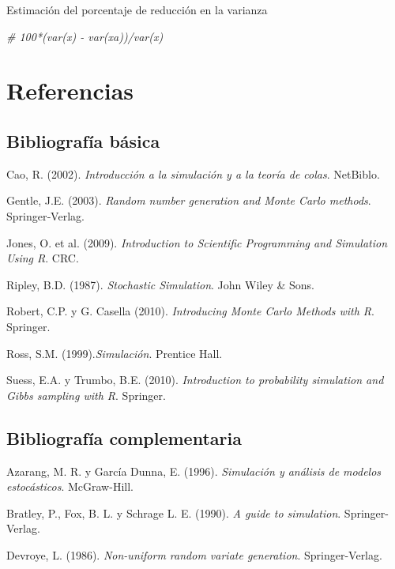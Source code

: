 \documentclass[]{book}
\newenvironment{Shaded}{\begin{snugshade}}{\end{snugshade}}
\newcommand{\CommentTok}[1]{\textcolor[rgb]{0.56,0.35,0.01}{\textit{#1}}}
\theoremstyle{definition}
\theoremstyle{definition}
\theoremstyle{definition}
\theoremstyle{remark}
\begin{document}
Estimación del porcentaje de reducción en la varianza

\begin{Shaded}
\begin{Highlighting}[]
\CommentTok{# 100*(var(x) - var(xa))/var(x)}
\end{Highlighting}
\end{Shaded}

\chapter*{Referencias}\label{referencias}

\section*{Bibliografía básica}\label{bibliografia-basica}

Cao, R. (2002). \emph{Introducción a la simulación y a la teoría de
colas}. NetBiblo.

Gentle, J.E. (2003). \emph{Random number generation and Monte Carlo
methods}. Springer‐Verlag.

Jones, O. et al. (2009). \emph{Introduction to Scientific Programming
and Simulation Using R}. CRC.

Ripley, B.D. (1987). \emph{Stochastic Simulation}. John Wiley \& Sons.

Robert, C.P. y G. Casella (2010). \emph{Introducing Monte Carlo Methods
with R}. Springer.

Ross, S.M. (1999).\emph{Simulación}. Prentice Hall.

Suess, E.A. y Trumbo, B.E. (2010). \emph{Introduction to probability
simulation and Gibbs sampling with R}. Springer.

\section*{Bibliografía
complementaria}\label{bibliografia-complementaria}

Azarang, M. R. y García Dunna, E. (1996). \emph{Simulación y análisis de
modelos estocásticos}. McGraw-Hill.

Bratley, P., Fox, B. L. y Schrage L. E. (1990). \emph{A guide to
simulation}. Springer-Verlag.

Devroye, L. (1986). \emph{Non-uniform random variate generation}.
Springer-Verlag.
\end{document}
